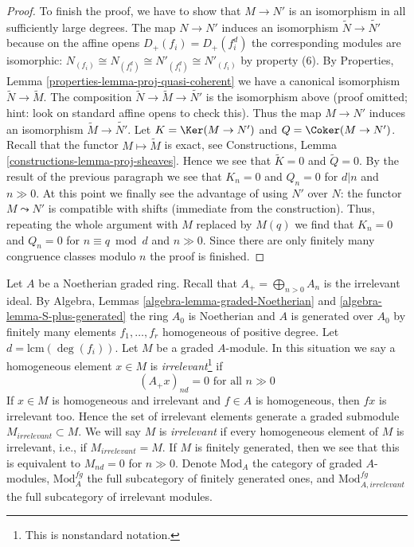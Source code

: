 \begin{proof}
\medskip\noindent
To finish the proof, we have to show that $M \to N'$ is an isomorphism
in all sufficiently large degrees. The map $N \to N'$ induces an
isomorphism $\widetilde{N} \to \widetilde{N'}$ because on the affine
opens $D_+(f_i) = D_+(f_i^d)$ the corresponding modules are isomorphic:
$N_{(f_i)} \cong N_{(f_i^d)} \cong N'_{(f_i^d)} \cong N'_{(f_i)}$
by property (6).
By Properties, Lemma \ref{properties-lemma-proj-quasi-coherent}
we have a canonical isomorphism $\widetilde{N} \to \widetilde{M}$.
The composition $\widetilde{N} \to \widetilde{M} \to \widetilde{N'}$
is the isomorphism above (proof omitted; hint: look on standard
affine opens to check this). Thus the map $M \to N'$ induces an isomorphism
$\widetilde{M} \to \widetilde{N'}$.
Let $K = \Ker(M \to N')$ and $Q = \Coker(M \to N')$.
Recall that the functor
$M \mapsto \widetilde{M}$ is exact, see
Constructions, Lemma \ref{constructions-lemma-proj-sheaves}.
Hence we see that $\widetilde{K} = 0$ and $\widetilde{Q} = 0$.
By the result of the previous paragraph we see that $K_n = 0$ and
$Q_n = 0$ for $d | n$ and $n \gg 0$. At this point we finally see
the advantage of using $N'$ over $N$: the functor $M \leadsto N'$
is compatible with shifts (immediate from the construction).
Thus, repeating the whole argument with $M$ replaced by $M(q)$
we find that $K_n = 0$ and $Q_n = 0$ for $n \equiv q \bmod d$
and $n \gg 0$. Since there are
only finitely many congruence classes modulo $n$ the proof is finished.
\end{proof}

\noindent
Let $A$ be a Noetherian graded ring. Recall that
$A_+ = \bigoplus_{n > 0} A_n$ is the irrelevant ideal.
By Algebra, Lemmas \ref{algebra-lemma-graded-Noetherian} and
\ref{algebra-lemma-S-plus-generated} the ring $A_0$ is Noetherian
and $A$ is generated over $A_0$ by finitely many elements
$f_1, \ldots, f_r$ homogeneous of positive degree.
Let $d = \text{lcm}(\deg(f_i))$. Let $M$ be a graded $A$-module.
In this situation we say a homogeneous element $x \in M$
is {\it irrelevant}\footnote{This is nonstandard notation.} if
$$
(A_+ x)_{nd} = 0\text{ for all }n \gg 0
$$
If $x \in M$ is homogeneous and irrelevant and $f \in A$
is homogeneous, then $fx$ is irrelevant too. Hence
the set of irrelevant elements generate a graded submodule
$M_{irrelevant} \subset M$. We will say $M$ is {\it irrelevant}
if every homogeneous element of $M$ is irrelevant, i.e.,
if $M_{irrelevant} = M$.
If $M$ is finitely generated, then we see that
this is equivalent to $M_{nd} = 0$ for $n \gg 0$.
Denote $\text{Mod}_A$ the category of graded $A$-modules,
$\text{Mod}^{fg}_A$ the full subcategory of finitely generated ones,
and $\text{Mod}^{fg}_{A, irrelevant}$ the full subcategory of
irrelevant modules.

